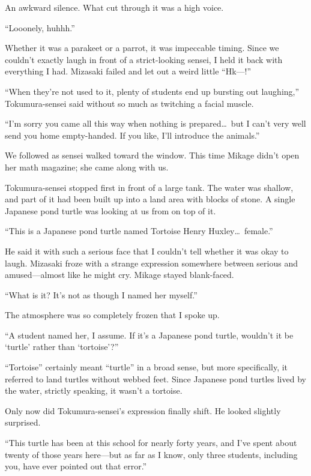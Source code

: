 \documentclass[
    a4paper,
    12pt,
    twoside,
    openany,
    UTF8,
    fontset=windows
]{ctexbook}
\begin{document}
An awkward silence. What cut through it was a high voice.

``Looonely, huhhh.''

Whether it was a parakeet or a parrot, it was impeccable timing. Since we couldn't exactly laugh in front of a strict-looking sensei, I held it back with everything I had. Mizasaki failed and let out a weird little ``Hk---!''

``When they're not used to it, plenty of students end up bursting out laughing,'' Tokumura-sensei said without so much as twitching a facial muscle.

``I'm sorry you came all this way when nothing is prepared\dots\ but I can't very well send you home empty-handed. If you like, I'll introduce the animals.''

We followed as sensei walked toward the window. This time Mikage didn't open her math magazine; she came along with us.

Tokumura-sensei stopped first in front of a large tank. The water was shallow, and part of it had been built up into a land area with blocks of stone. A single Japanese pond turtle was looking at us from on top of it.

``This is a Japanese pond turtle named Tortoise Henry Huxley\dots\ female.''

He said it with such a serious face that I couldn't tell whether it was okay to laugh. Mizasaki froze with a strange expression somewhere between serious and amused---almost like he might cry. Mikage stayed blank-faced.

``What is it? It's not as though I named her myself.''

The atmosphere was so completely frozen that I spoke up.

``A student named her, I assume. If it's a Japanese pond turtle, wouldn't it be `turtle' rather than `tortoise'?''

``Tortoise'' certainly meant ``turtle'' in a broad sense, but more specifically, it referred to land turtles without webbed feet. Since Japanese pond turtles lived by the water, strictly speaking, it wasn't a tortoise.

Only now did Tokumura-sensei's expression finally shift. He looked slightly surprised.

``This turtle has been at this school for nearly forty years, and I've spent about twenty of those years here---but as far as I know, only three students, including you, have ever pointed out that error.''
\end{document}
